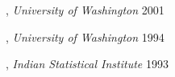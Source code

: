 
, \textit{University of Washington}	\hfill 2001

, \textit{University of Washington} \hfill	1994

, \textit{Indian Statistical Institute} \hfill 1993
